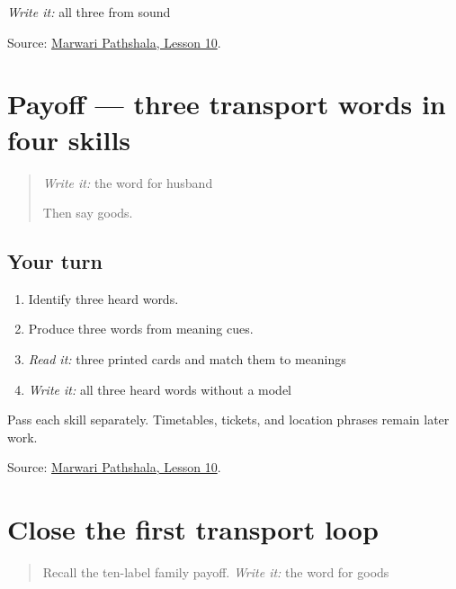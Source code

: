 \emph{Write it:} all three from sound

\begin{tcolorbox}[breakable,colback=teal!4,colframe=teal!35!black,title={Before you move on}]
Source: \href{https://www.marwaripathshala.com/marwari-lesson-10-english}{Marwari Pathshala, Lesson 10}.
\end{tcolorbox}
\section[Practice]{Payoff — three transport words in four skills}

\label{lesson:MW-C16-transport-three}



\begin{quote}
\emph{Write it:} the word for husband

Then say goods.
\end{quote}

\subsection*{Your turn}
\begin{enumerate}
\raggedright
  \item Identify three heard words.
  \item Produce three words from meaning cues.
  \item \emph{Read it:} three printed cards and match them to meanings
  \item \emph{Write it:} all three heard words without a model
\end{enumerate}

Pass each skill separately. Timetables, tickets, and location phrases remain later work.

\begin{tcolorbox}[breakable,colback=teal!4,colframe=teal!35!black,title={Before you move on}]
Source: \href{https://www.marwaripathshala.com/marwari-lesson-10-english}{Marwari Pathshala, Lesson 10}.
\end{tcolorbox}
\section[Practice]{Close the first transport loop}

\label{lesson:MW-R16-transport-close}



\begin{quote}
Recall the ten-label family payoff. \emph{Write it:} the word for goods
\end{quote}

